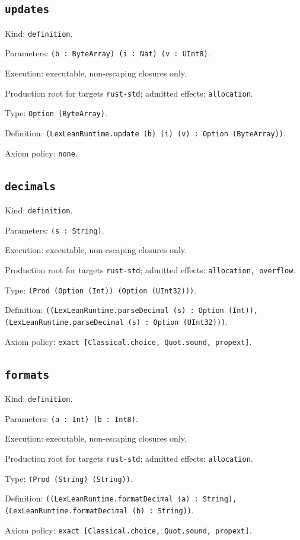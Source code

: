 \documentclass[11pt]{article}
\begin{document}
\subsection*{\texttt{updates}}
\noindent Kind: \texttt{definition}.\par
\noindent Parameters: \texttt{(b : ByteArray) (i : Nat) (v : UInt8)}.\par
\noindent Execution: executable, non-escaping closures only.\par
\noindent Production root for targets \texttt{rust-std}; admitted effects: \texttt{allocation}.\par
\noindent Type: \texttt{Option (ByteArray)}.\par
\noindent Definition: \texttt{(LexLeanRuntime.update (b) (i) (v) : Option (ByteArray))}.\par
\noindent Axiom policy: \texttt{none}.\par
\subsection*{\texttt{decimals}}
\noindent Kind: \texttt{definition}.\par
\noindent Parameters: \texttt{(s : String)}.\par
\noindent Execution: executable, non-escaping closures only.\par
\noindent Production root for targets \texttt{rust-std}; admitted effects: \texttt{allocation, overflow}.\par
\noindent Type: \texttt{(Prod (Option (Int)) (Option (UInt32)))}.\par
\noindent Definition: \texttt{((LexLeanRuntime.parseDecimal (s) : Option (Int)), (LexLeanRuntime.parseDecimal (s) : Option (UInt32)))}.\par
\noindent Axiom policy: \texttt{exact [Classical.choice, Quot.sound, propext]}.\par
\subsection*{\texttt{formats}}
\noindent Kind: \texttt{definition}.\par
\noindent Parameters: \texttt{(a : Int) (b : Int8)}.\par
\noindent Execution: executable, non-escaping closures only.\par
\noindent Production root for targets \texttt{rust-std}; admitted effects: \texttt{allocation}.\par
\noindent Type: \texttt{(Prod (String) (String))}.\par
\noindent Definition: \texttt{((LexLeanRuntime.formatDecimal (a) : String), (LexLeanRuntime.formatDecimal (b) : String))}.\par
\noindent Axiom policy: \texttt{exact [Classical.choice, Quot.sound, propext]}.\par
\end{document}
